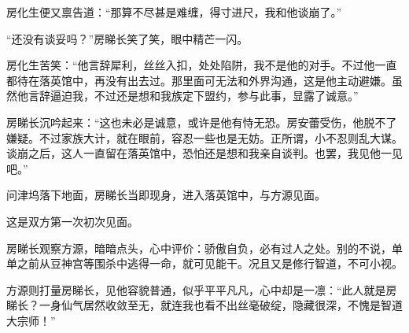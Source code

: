 \begin{this_body}
房化生便又禀告道：“那算不尽甚是难缠，得寸进尺，我和他谈崩了。”

“还没有谈妥吗？”房睇长笑了笑，眼中精芒一闪。

房化生苦笑：“他言辞犀利，丝丝入扣，处处陷阱，我不是他的对手。不过他一直都待在落英馆中，再没有出去过。那里面可无法和外界沟通，这是他主动避嫌。虽然他言辞逼迫我，不过还是想和我族定下盟约，参与此事，显露了诚意。”

房睇长沉吟起来：“这也未必是诚意，或许是他有恃无恐。房安蕾受伤，他脱不了嫌疑。不过家族大计，就在眼前，容忍一些也是无妨。正所谓，小不忍则乱大谋。谈崩之后，这人一直留在落英馆中，恐怕还是想和我亲自谈判。也罢，我见他一见吧。”

问津坞落下地面，房睇长当即现身，进入落英馆中，与方源见面。

这是双方第一次初次见面。

房睇长观察方源，暗暗点头，心中评价：骄傲自负，必有过人之处。别的不说，单单之前从豆神宫等围杀中逃得一命，就可见能干。况且又是修行智道，不可小视。

方源则打量房睇长，见他容貌普通，似乎平平凡凡，心中却是一凛：“此人就是房睇长？一身仙气居然收敛至无，就连我也看不出丝毫破绽，隐藏很深，不愧是智道大宗师！”

\end{this_body}

